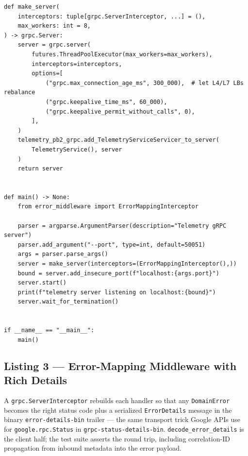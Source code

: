 \begin{verbatim}
def make_server(
    interceptors: tuple[grpc.ServerInterceptor, ...] = (),
    max_workers: int = 8,
) -> grpc.Server:
    server = grpc.server(
        futures.ThreadPoolExecutor(max_workers=max_workers),
        interceptors=interceptors,
        options=[
            ("grpc.max_connection_age_ms", 300_000),  # let L4/L7 LBs rebalance
            ("grpc.keepalive_time_ms", 60_000),
            ("grpc.keepalive_permit_without_calls", 0),
        ],
    )
    telemetry_pb2_grpc.add_TelemetryServiceServicer_to_server(
        TelemetryService(), server
    )
    return server


def main() -> None:
    from error_middleware import ErrorMappingInterceptor

    parser = argparse.ArgumentParser(description="Telemetry gRPC server")
    parser.add_argument("--port", type=int, default=50051)
    args = parser.parse_args()
    server = make_server(interceptors=(ErrorMappingInterceptor(),))
    bound = server.add_insecure_port(f"localhost:{args.port}")
    server.start()
    print(f"telemetry server listening on localhost:{bound}")
    server.wait_for_termination()


if __name__ == "__main__":
    main()
\end{verbatim}

\subsection{Listing 3 --- Error-Mapping Middleware with Rich Details}
\label{subsec:ch13-code-middleware}

A \texttt{grpc.ServerInterceptor} rebuilds each handler so that any
\texttt{DomainError} becomes the right status code plus a serialized
\texttt{ErrorDetails} message in the binary \texttt{error-details-bin} trailer
--- the same transport trick Google APIs use for \texttt{google.rpc.Status} in
\texttt{grpc-status-details-bin}. \texttt{decode\_error\_details} is the client
half; the test suite asserts the round trip, including correlation-ID
propagation from inbound metadata into the error payload.

